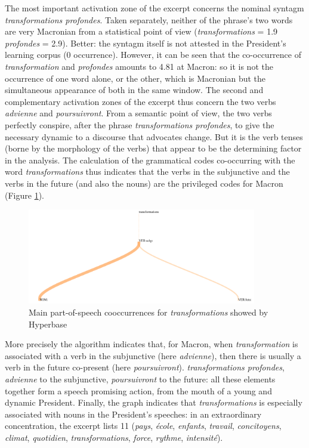 The most important activation zone of the excerpt concerns the nominal syntagm \textit{transformations profondes}. Taken separately, neither of the phrase's two words are very Macronian from a statistical point of view (\textit{transformations} = 1.9 \textit{profondes} = 2.9). Better: the syntagm itself is not attested in the President's learning corpus (0 occurrence). However, it can be seen that the co-occurrence of \textit{transformation} and \textit{profondes} amounts to 4.81 at Macron: so it is not the occurrence of one word alone, or the other, which is Macronian but the simultaneous appearance of both in the same window. The second and complementary activation zones of the excerpt thus concern the two verbs \textit{advienne} and \textit{poursuivront}. From a semantic point of view, the two verbs perfectly conspire, after the phrase \textit{transformations profondes}, to give the necessary dynamic to a discourse that advocates change. But it is the verb tenses (borne by the morphology of the verbs) that appear to be the determining factor in the analysis. The calculation of the grammatical codes co-occurring with the word \textit{transformations} thus indicates that the verbs in the subjunctive and the verbs in the future (and also the nouns) are the privileged codes for Macron (Figure \ref{macron}). 

\begin{figure}[h]
\begin{center}
\includegraphics[width=10cm]{img/macron_cooc.png}
\caption{Main part-of-speech cooccurrences for \textit{transformations} showed by Hyperbase}
\label{macron}
\end{center}
\end{figure}


More precisely the algorithm indicates that, for Macron, when \textit{transformation} is associated with a verb in the subjunctive (here \textit{advienne}), then there is usually a verb in the future co-present (here \textit{poursuivront}). \textit{transformations profondes}, \textit{advienne} to the subjunctive, \textit{poursuivront} to the future: all these elements together form a speech promising action, from the mouth of a young and dynamic President. Finally, the graph indicates that \textit{transformations} is especially associated with nouns in the President's speeches: in an extraordinary concentration, the excerpt lists 11 (\textit{pays}, \textit{école}, \textit{enfants}, \textit{travail}, \textit{concitoyens}, \textit{climat}, \textit{quotidien}, \textit{transformations}, \textit{force}, \textit{rythme}, \textit{intensité}).

